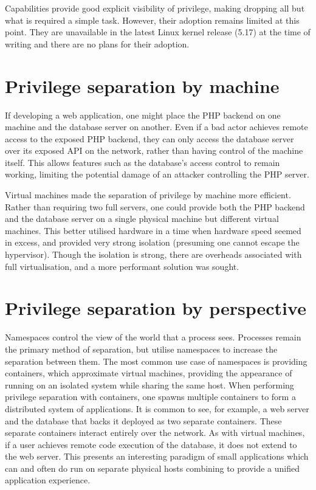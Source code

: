 \documentclass[12pt,a4paper,twoside]{report}
\begin{document}
Capabilities provide good explicit visibility of privilege, making dropping all but what is required a simple task. However, their adoption remains limited at this point. They are unavailable in the latest Linux kernel release (5.17) at the time of writing and there are no plans for their adoption.

\section{Privilege separation by machine}
\label{sec:priv-sep-another-machine}

If developing a web application, one might place the PHP backend on one machine and the database server on another. Even if a bad actor achieves remote access to the exposed PHP backend, they can only access the database server over its exposed API on the network, rather than having control of the machine itself. This allows features such as the database's access control to remain working, limiting the potential damage of an attacker controlling the PHP server.

Virtual machines \citep{barham_xen_2003,vmware_inc_understanding_2008} made the separation of privilege by machine more efficient. Rather than requiring two full servers, one could provide both the PHP backend and the database server on a single physical machine but different virtual machines. This better utilised hardware in a time when hardware speed seemed in excess, and provided very strong isolation (presuming one cannot escape the hypervisor). Though the isolation is strong, there are overheads associated with full virtualisation, and a more performant solution was sought.

\section{Privilege separation by perspective}
\label{sec:priv-sep-perspective}

Namespaces control the view of the world that a process sees. Processes remain the primary method of separation, but utilise namespaces to increase the separation between them. The most common use case of namespaces is providing containers, which approximate virtual machines, providing the appearance of running on an isolated system while sharing the same host. When performing privilege separation with containers, one spawns multiple containers to form a distributed system of applications. It is common to see, for example, a web server and the database that backs it deployed as two separate containers. These separate containers interact entirely over the network. As with virtual machines, if a user achieves remote code execution of the database, it does not extend to the web server. This presents an interesting paradigm of small applications which can and often do run on separate physical hosts combining to provide a unified application experience.
\end{document}
